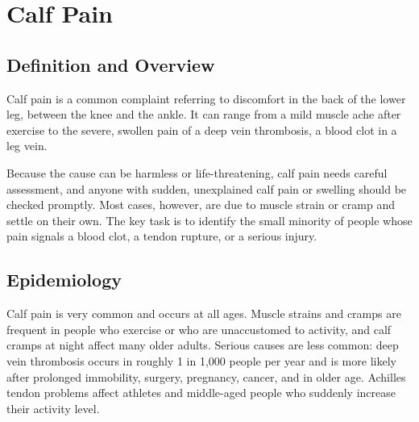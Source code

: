 \chapter{Calf Pain}

\section*{Definition and Overview}
Calf pain is a common complaint referring to discomfort in the back of the lower leg, between the knee and the ankle. It can range from a mild muscle ache after exercise to the severe, swollen pain of a deep vein thrombosis, a blood clot in a leg vein.

Because the cause can be harmless or life-threatening, calf pain needs careful assessment, and anyone with sudden, unexplained calf pain or swelling should be checked promptly. Most cases, however, are due to muscle strain or cramp and settle on their own. The key task is to identify the small minority of people whose pain signals a blood clot, a tendon rupture, or a serious injury.

\section*{Epidemiology}
Calf pain is very common and occurs at all ages. Muscle strains and cramps are frequent in people who exercise or who are unaccustomed to activity, and calf cramps at night affect many older adults. Serious causes are less common: deep vein thrombosis occurs in roughly 1 in 1,000 people per year and is more likely after prolonged immobility, surgery, pregnancy, cancer, and in older age. Achilles tendon problems affect athletes and middle-aged people who suddenly increase their activity level.

